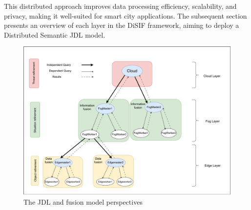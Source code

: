 \documentclass[5p,times]{elsarticle}
\begin{document}
This distributed approach improves data processing efficiency, scalability, and privacy, making it well-suited for smart city applications.
The subsequent section presents an overview of each layer in the DiSIF framework, aiming to deploy a Distributed Semantic JDL model.









\begin{figure}[t]
    \centering
    \includegraphics[width=\columnwidth]{h3.drawio.pdf}
    \caption{The JDL and fusion model perspectives}
    \label{fig:JDLandFusionprespective}
  \end{figure}
\end{document}
